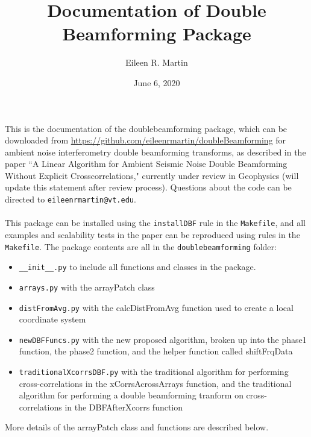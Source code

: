 \documentclass{article}
\title{Documentation of Double Beamforming Package}
\date{June 6, 2020}
\author{Eileen R. Martin}
\begin{document}
\maketitle

This is the documentation of the doublebeamforming package, which can be downloaded from 
    \url{https://github.com/eileenrmartin/doubleBeamforming}
for ambient noise interferometry double beamforming transforms, as described in the paper ``A Linear Algorithm for Ambient Seismic Noise Double Beamforming Without Explicit Crosscorrelations," currently under review in Geophysics (will update this statement after review process). Questions about the code can be directed to \texttt{eileenrmartin@vt.edu}.
\\
\\
This package can be installed using the \texttt{installDBF} rule in the \texttt{Makefile}, and all examples and scalability tests in the paper can be reproduced using rules in the \texttt{Makefile}. The package contents are all in the \texttt{doublebeamforming} folder:
\begin{itemize}
    \item \texttt{\_\_init\_\_.py} to include all functions and classes in the package.
    \item \texttt{arrays.py} with the arrayPatch class
    \item \texttt{distFromAvg.py} with the calcDistFromAvg function used to create a local coordinate system
    \item \texttt{newDBFFuncs.py} with the new proposed algorithm, broken up into the phase1 function, the phase2 function, and the helper function called shiftFrqData
    \item \texttt{traditionalXcorrsDBF.py} with the traditional algorithm for performing cross-correlations in the xCorrsAcrossArrays function, and the traditional algorithm for performing a double beamforming tranform on cross-correlations in the DBFAfterXcorrs function
\end{itemize}
More details of the arrayPatch class and functions are described below.
\end{document}

